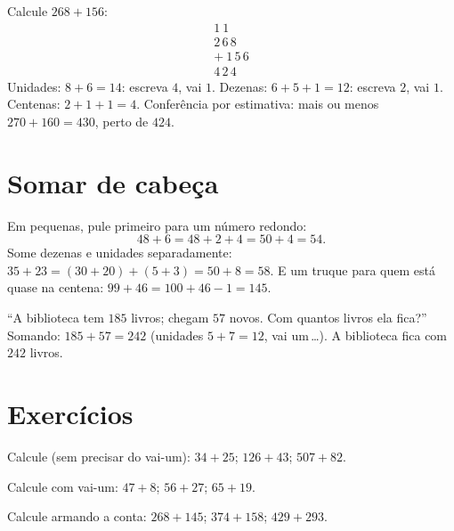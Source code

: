\begin{example}\label{ex:g2:addition:worked}
Calcule $268 + 156$:
\[
\begin{array}{r}
{\scriptstyle 1}\ {\scriptstyle 1}\ \phantom{0} \\[-3pt]
2\,6\,8 \\
+\ 1\,5\,6 \\
\hline
4\,2\,4
\end{array}
\]
Unidades: $8 + 6 = 14$: escreva $4$, vai $1$. Dezenas:
$6 + 5 + 1 = 12$: escreva $2$, vai $1$. Centenas:
$2 + 1 + 1 = 4$. Conferência por estimativa: mais ou menos
$270 + 160 = 430$, perto de $424$. \checkmark
\end{example}

\section{Somar de cabeça}

\begin{example}\label{ex:g2:addition:mental}
Em  pequenas, pule primeiro para um número redondo:
\[
48 + 6 = 48 + 2 + 4 = 50 + 4 = 54 .
\]
Some dezenas e unidades separadamente:
$35 + 23 = (30 + 20) + (5 + 3) = 50 + 8 = 58$. E um truque para
quem está quase na centena: $99 + 46 = 100 + 46 - 1 = 145$.
\end{example}

\begin{example}[Um probleminha]\label{ex:g2:addition:problem}
``A biblioteca tem $185$ livros; chegam $57$ novos. Com quantos
livros ela fica?'' Somando: $185 + 57 = 242$ (unidades
$5 + 7 = 12$, vai um\,\dots). A biblioteca fica com $242$ livros.
\end{example}

\section{Exercícios}

\begin{exercise}[$\star$]\label{exo:g2:addition:1}
Calcule (sem precisar do vai-um): $34 + 25$; \quad $126 + 43$; \quad
$507 + 82$.
\end{exercise}

\begin{exercise}[$\star$]\label{exo:g2:addition:2}
Calcule com vai-um: $47 + 8$; \quad $56 + 27$; \quad $65 + 19$.
\end{exercise}

\begin{exercise}[$\star$]\label{exo:g2:addition:3}
Calcule armando a conta: $268 + 145$; \quad $374 + 158$; \quad
$429 + 293$.
\end{exercise}

